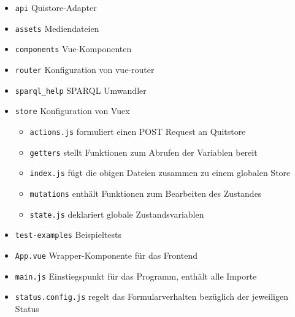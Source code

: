 \documentclass[a4paper,11pt,oneside, titlepage]{article}
\begin{document}

    \begin{itemize}
      \item \verb+api+ Quistore-Adapter
      \item \verb+assets+ Mediendateien
      \item \verb+components+ Vue-Komponenten
      \item \verb+router+ Konfiguration von vue-router
      \item \verb+sparql_help+ SPARQL Umwandler
      \item \verb+store+ Konfiguration von Vuex
        \begin{itemize}
          \item \verb+actions.js+ formuliert einen POST Request an Quitstore
          \item \verb+getters+ stellt Funktionen zum Abrufen der Variablen bereit
          \item \verb+index.js+ fügt die obigen Dateien zusammen zu einem globalen Store
          \item \verb+mutations+ enthält Funktionen zum Bearbeiten des Zustandes
          \item \verb+state.js+ deklariert globale Zustandsvariablen
        \end{itemize}
      \item \verb+test-examples+ Beispieltests
      \item \verb+App.vue+ Wrapper-Komponente für das Frontend
      \item \verb+main.js+ Einstiegspunkt für das Programm, enthält alle Importe
      \item \verb+status.config.js+ regelt das Formularverhalten bezüglich der jeweiligen Status
    \end{itemize}

\begin{minipage}{16cm}
\end{minipage}
\end{document}
